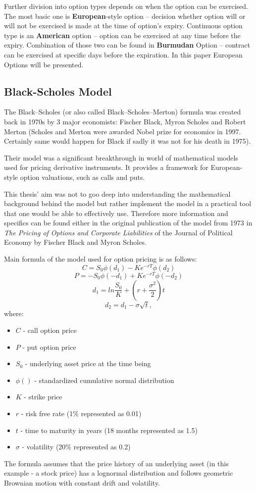     Further division into option types depends on when the option can be exercised. The most basic one is \textbf{European}-style option -- decision whether option will or will not be exercised is made at the time of option's expiry. Continuous option type is an \textbf{American} option -- option can be exercised at any time before the expiry. Combination of those two can be found in \textbf{Burmudan} Option -- contract can be exercised at specific days before the expiration. In this paper European Options will be presented\cite{Option_Types}.

\subsection{Black-Scholes Model}
    The Black--Scholes (or also called Black--Scholes--Merton) formula was created back in 1970s by 3 major economists: Fischer Black, Myron Scholes and Robert Merton (Scholes and Merton were awarded Nobel prize for economics in 1997. Certainly same would happen for Black if sadly it was not for his death in 1975).
    
    Their model was a significant breakthrough in world of mathematical models used for pricing derivative instruments. It provides a framework for European-style option valuations, such as calls and puts.
    
    This thesis' aim was not to goo deep into understanding the mathematical background behind the model but rather implement the model in a practical tool that one would be able to effectively use. Therefore more information and specifics can be found either in the original publication \cite{10.2307/1831029} of the model from 1973 in \textit{The Pricing of Options and Corporate Liabilities} of the Journal of Political Economy by Fischer Black and Myron Scholes.
    
    Main formula of the model used for option pricing is as follows:
    $$
    C = S_0\phi(d_1) - Ke^{-rT}\phi(d_2)
    $$
    $$
    P = -S_0\phi(-d_1) + Ke^{-rT}\phi(-d_2)
    $$
    $$
    d_1 = ln\frac{S_0}{K} + (r+\frac{\sigma^2}{2})t
    $$
    $$
    d_2 = d_1 - \sigma\sqrt{t},
    $$
    where:
    \begin{itemize}
        \item $C$ - call option price
        \item $P$ - put option price
        \item $S_0$ - underlying asset price at the time being
        \item $\phi()$ - standardized cumulative normal distribution
        \item $K$ - strike price
        \item $r$ - risk free rate (1\% represented as 0.01)
        \item $t$ - time to maturity in years (18 months represented as 1.5)
        \item $\sigma$ - volatility (20\% represented as 0.2)
    
    \end{itemize}
    
    The formula assumes that the price history of an underlying asset (in this example - a stock price) has a lognormal distribution and follows geometric Brownian motion with constant drift and volatility. 
